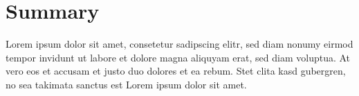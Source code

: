 \chapter*{Summary}
\label{ch:summary}

Lorem ipsum dolor sit amet, consetetur sadipscing elitr, sed diam nonumy eirmod
tempor invidunt ut labore et dolore magna aliquyam erat, sed diam voluptua. At
vero eos et accusam et justo duo dolores et ea rebum. Stet clita kasd gubergren,
no sea takimata sanctus est Lorem ipsum dolor sit amet.
